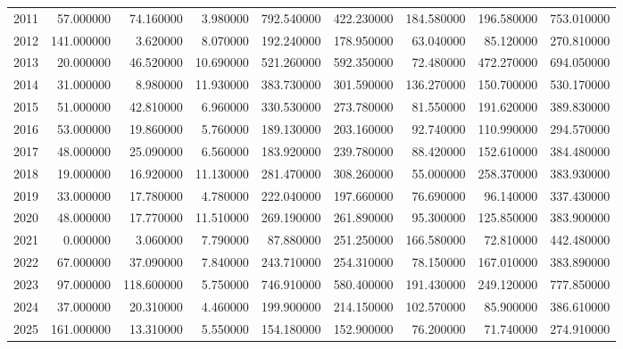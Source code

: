 \begin{tabular}{lrrrrrrrr}
2011 & 57.000000 & 74.160000 & 3.980000 & 792.540000 & 422.230000 & 184.580000 & 196.580000 & 753.010000 \\
2012 & 141.000000 & 3.620000 & 8.070000 & 192.240000 & 178.950000 & 63.040000 & 85.120000 & 270.810000 \\
2013 & 20.000000 & 46.520000 & 10.690000 & 521.260000 & 592.350000 & 72.480000 & 472.270000 & 694.050000 \\
2014 & 31.000000 & 8.980000 & 11.930000 & 383.730000 & 301.590000 & 136.270000 & 150.700000 & 530.170000 \\
2015 & 51.000000 & 42.810000 & 6.960000 & 330.530000 & 273.780000 & 81.550000 & 191.620000 & 389.830000 \\
2016 & 53.000000 & 19.860000 & 5.760000 & 189.130000 & 203.160000 & 92.740000 & 110.990000 & 294.570000 \\
2017 & 48.000000 & 25.090000 & 6.560000 & 183.920000 & 239.780000 & 88.420000 & 152.610000 & 384.480000 \\
2018 & 19.000000 & 16.920000 & 11.130000 & 281.470000 & 308.260000 & 55.000000 & 258.370000 & 383.930000 \\
2019 & 33.000000 & 17.780000 & 4.780000 & 222.040000 & 197.660000 & 76.690000 & 96.140000 & 337.430000 \\
2020 & 48.000000 & 17.770000 & 11.510000 & 269.190000 & 261.890000 & 95.300000 & 125.850000 & 383.900000 \\
2021 & 0.000000 & 3.060000 & 7.790000 & 87.880000 & 251.250000 & 166.580000 & 72.810000 & 442.480000 \\
2022 & 67.000000 & 37.090000 & 7.840000 & 243.710000 & 254.310000 & 78.150000 & 167.010000 & 383.890000 \\
2023 & 97.000000 & 118.600000 & 5.750000 & 746.910000 & 580.400000 & 191.430000 & 249.120000 & 777.850000 \\
2024 & 37.000000 & 20.310000 & 4.460000 & 199.900000 & 214.150000 & 102.570000 & 85.900000 & 386.610000 \\
2025 & 161.000000 & 13.310000 & 5.550000 & 154.180000 & 152.900000 & 76.200000 & 71.740000 & 274.910000 \\
\bottomrule
\end{tabular}
